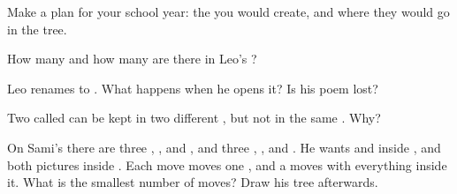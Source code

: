 \begin{exercise}[$\star$]\label{exo:g3:files-and-folders:7}
Make a  plan for your school year: the  you would create, and
where they would go in the tree.
\end{exercise}

\begin{exercise}[$\star$]\label{exo:g3:files-and-folders:8}
How many  and how many  are there in Leo's ?
\end{exercise}

\begin{exercise}[$\star\star$]\label{exo:g3:files-and-folders:9}
Leo renames  to . What happens when he opens it?
Is his poem lost?
\end{exercise}

\begin{exercise}[$\star\star$]\label{exo:g3:files-and-folders:10}
Two  called  can be kept in two different , but
not in the same . Why?
\end{exercise}

\begin{exercise}[$\star\star$]\label{exo:g3:files-and-folders:11}
On Sami's  there are three , , 
and , and three , ,  and
. He wants  and  inside
, and both pictures inside . Each move moves one
, and a  moves with everything inside it. What is the smallest
number of moves? Draw his tree afterwards.
\end{exercise}
